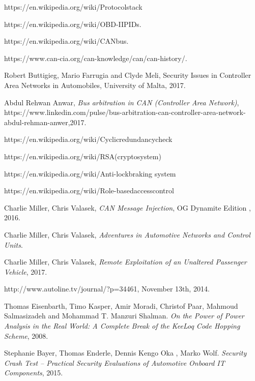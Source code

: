 \documentclass[11pt]{article}
\begin{document}
\begin{thebibliography}{10}
	https://en.wikipedia.org/wiki/Protocol\textunderscore stack
	
	https://en.wikipedia.org/wiki/OBD-II\textunderscore PIDs.
	
	https://en.wikipedia.org/wiki/CAN\textunderscore bus.
	
	https://www.can-cia.org/can-knowledge/can/can-history/.
	
	Robert Buttigieg, Mario Farrugia and Clyde Meli, Security Issues in Controller Area Networks in Automobiles, University of Malta, 2017.
	
	Abdul Rehwan Anwar, \textit{Bus arbitration in CAN (Controller Area Network)}, https://www.linkedin.com/pulse/bus-arbitration-can-controller-area-network-abdul-rehman-anwer,2017.
	
	https://en.wikipedia.org/wiki/Cyclic\textunderscore redundancy\textunderscore check
	
	https://en.wikipedia.org/wiki/RSA\textunderscore (cryptosystem)
	
	https://en.wikipedia.org/wiki/Anti-lock\textunderscore braking \textunderscore system
	
	https://en.wikipedia.org/wiki/Role-based\textunderscore access\textunderscore control
	
	Charlie Miller, Chris Valasek,
	\textit{CAN Message Injection},
	OG Dynamite Edition
	, 2016.

	Charlie Miller, Chris Valasek,
	\textit{Adventures in Automotive Networks and Control Units}.
	
	Charlie Miller, Chris Valasek,
	\textit{Remote Exploitation of an Unaltered Passenger Vehicle}, 2017.
	
	http://www.autoline.tv/journal/?p=34461, November 13th, 2014.
	
	Thomas Eisenbarth, Timo Kasper, Amir Moradi, Christof Paar, Mahmoud Salmasizadeh and Mohammad T. Manzuri Shalman.
	\textit{On the Power of Power Analysis in the Real World: A Complete Break of the KeeLoq Code Hopping Scheme}, 2008.
	
	Stephanie Bayer, Thomas Enderle, Dennis Kengo Oka , Marko Wolf.
	\textit{Security Crash Test – Practical Security Evaluations of Automotive Onboard IT Components}, 2015.
	

\end{thebibliography}
\end{document}
